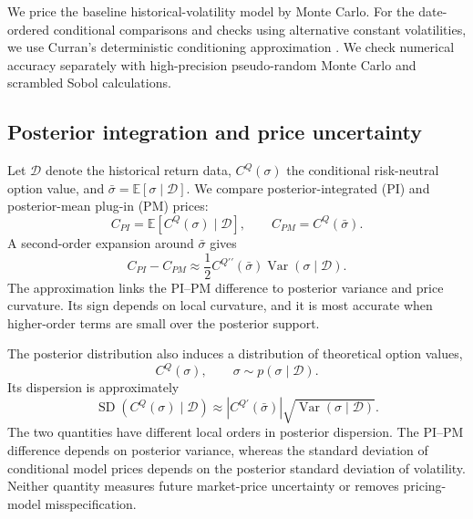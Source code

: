 We price the baseline historical-volatility model by Monte Carlo. For the date-ordered conditional comparisons and checks using alternative constant volatilities, we use Curran's deterministic conditioning approximation \citep{curran1994}. We check numerical accuracy separately with high-precision pseudo-random Monte Carlo and scrambled Sobol calculations.

\subsection{Posterior integration and price uncertainty}

Let \(\mathcal D\) denote the historical return data, \(C^Q(\sigma)\) the conditional risk-neutral option value, and \(\bar\sigma=\mathbb E[\sigma\mid\mathcal D]\). We compare posterior-integrated (PI) and posterior-mean plug-in (PM) prices:
\begin{equation}
 C_{PI}=\mathbb E[C^Q(\sigma)\mid\mathcal D],
 \qquad
 C_{PM}=C^Q(\bar\sigma).
 \label{eq:short_pi_pm}
\end{equation}
A second-order expansion around \(\bar\sigma\) gives
\begin{equation}
 C_{PI}-C_{PM}
 \approx
 \frac12 C^{Q\prime\prime}(\bar\sigma)
 \operatorname{Var}(\sigma\mid\mathcal D).
 \label{eq:short_taylor}
\end{equation}
The approximation links the PI--PM difference to posterior variance and price curvature. Its sign depends on local curvature, and it is most accurate when higher-order terms are small over the posterior support.

The posterior distribution also induces a distribution of theoretical option values,
\begin{equation}
 C^Q(\sigma),\qquad \sigma\sim p(\sigma\mid\mathcal D).
 \label{eq:short_pushforward}
\end{equation}
Its dispersion is approximately
\begin{equation}
 \operatorname{SD}\!\left(C^Q(\sigma)\mid\mathcal D\right)
 \approx
 \left|C^{Q\prime}(\bar\sigma)\right|
 \sqrt{\operatorname{Var}(\sigma\mid\mathcal D)}.
 \label{eq:short_delta}
\end{equation}
The two quantities have different local orders in posterior dispersion. The PI--PM difference depends on posterior variance, whereas the standard deviation of conditional model prices depends on the posterior standard deviation of volatility. Neither quantity measures future market-price uncertainty or removes pricing-model misspecification.


